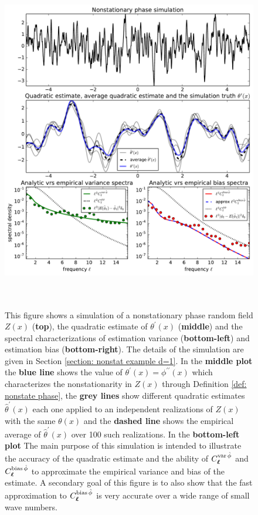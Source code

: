 \documentclass[10pt,noinfoline]{imsart}
\newcommand{\bs}{\boldsymbol}
\begin{document}
\begin{figure}
\includegraphics[height=15cm]{figure2.pdf}%
\caption{ This figure shows a simulation of a nonstationary phase random field $Z(x)$ (\textbf{top}), the quadratic estimate of  $\theta^\prime(x)$ (\textbf{middle}) and the spectral characterizations of estimation variance (\textbf{bottom-left}) and estimation bias (\textbf{bottom-right}). The details of the simulation are given in Section \ref{section: nonstat example d=1}. In the \textbf{middle plot} the \textbf{blue line} shows the value of $\theta^\prime(x)=\phi^{\prime\prime}(x)$ which characterizes the nonstationarity in $Z(x)$ through Definition \ref{def: nonstate phase}, the  \textbf{grey lines} show different quadratic estimates $\hat\theta^\prime(x)$ each one applied to an independent realizations of $Z(x)$ with the same $\theta(x)$ and the \textbf{dashed line} shows the empirical average of $\hat\theta^\prime(x)$ over 100 such realizations. In the \textbf{bottom-left plot}
The main purpose of this simulation is intended to illustrate the accuracy of the quadratic estimate and the ability of $C^{\text{var\,}\hat\phi}_{\bs \ell}$ and $C^{\text{bias\,}\hat\phi}_{\bs \ell}$ to approximate the empirical variance and bias of the estimate. A secondary goal of this figure is to also show that the fast approximation to $C^{\text{bias\,}\hat\phi}_{\bs \ell}$ is very accurate over a wide range of small wave numbers.}
\label{Figure 2 zx and var}
\end{figure}
\end{document}
